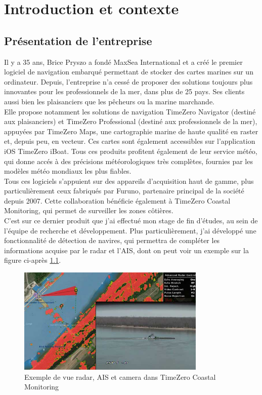 \chapter{Introduction et contexte}


\section{Présentation de l'entreprise}

Il y a 35 ans, Brice Pryszo a fondé MaxSea International et a créé le premier logiciel de navigation embarqué 
permettant de stocker des cartes marines sur un ordinateur. Depuis, l'entreprise n'a cessé de proposer
des solutions toujours plus innovantes pour les professionnels de la mer, dans plus de 25 pays. 
Ses clients aussi bien les plaisanciers que les pêcheurs ou la marine marchande. \\ Elle propose notamment les solutions de navigation TimeZero Navigator (destiné aux plaisanciers) 
et TimeZero Professional (destiné aux professionnels de la mer), appuyées par TimeZero Maps, 
une cartographie marine de haute qualité en raster et, depuis peu, en vecteur. 
Ces cartes sont également accessibles sur l'application iOS TimeZero iBoat. 
Tous ces produits profitent également de leur service météo, qui donne accés à des précisions
météorologiques très complètes, fournies par les modèles météo mondiaux les plus fiables.\\ 

Tous ces logiciels s'appuient sur des appareils d'acquisition haut de gamme, plus particulièrement
ceux fabriqués par Furuno, partenaire principal de la société depuis 2007. Cette collaboration
bénéficie également à TimeZero Coastal Monitoring, qui permet de surveiller les zones côtières. \\

C'est sur ce dernier produit que j'ai effectué mon stage de fin d'études, au sein de l'équipe 
de recherche et développement. Plus particulièrement, j'ai développé une fonctionnalité 
de détection de navires, qui permettra de compléter les informations acquise par le radar 
et l'AIS, dont on peut voir un exemple sur la figure ci-après \ref{fig:radar}.

\begin{figure}[H]
    \centering
    \includegraphics[width=0.8\textwidth]{./img/ports-harbors-cameras1.jpg}
    \caption{Exemple de vue radar, AIS et camera dans TimeZero Coastal Monitoring}
    \label{fig:radar}
\end{figure}

